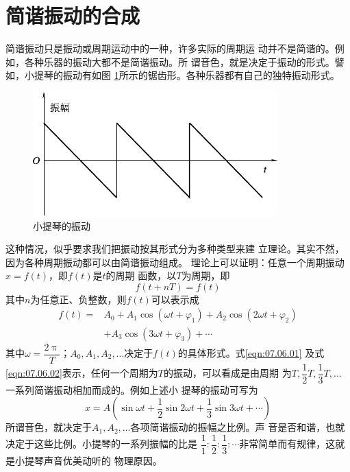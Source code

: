 \section{简谐振动的合成}\label{sec:07.06}

简谐振动只是振动或周期运动中的一种，许多实际的周期运
\clearpage
\noindent 动并不是简谐的。例如，各种乐器的振动大都不是简谐振动。所
谓音色，就是决定于振动的形式。譬如，小提琴的振动有如图
\ref{fig:07.10}\;所示的锯齿形。各种乐器都有自己的独特振动形式。

\begin{figure}[h]
  \centering
  \includegraphics{figure/fig07.10}
  \caption{小提琴的振动}
  \label{fig:07.10}
\end{figure}

这种情况，似乎要求我们把振动按其形式分为多种类型来建
立理论。其实不然，因为各种周期振动都可以由简谐振动组成。
理论上可以证明：任意一个周期振动$ x = f \left( t \right) $，即$ f \left( t \right) $是$ t $的周期
函数，以$ T $为周期，即
\begin{equation}\label{eqn:07.06.01}
  f \left( t + n T \right) = f ( t )
\end{equation}
其中$ n $为任意正、负整数，则$ f \left( t \right) $可以表示成
{\setlength{\mathindent}{4em}
\begin{equation}\label{eqn:07.06.02}
  \begin{aligned}
    f \left( t \right) = & A _ { 0 } + A _ { 1 } \cos \left( \omega t + \varphi _ { 1 } \right) + A _ { 2 } \cos \left( 2 \omega t + \varphi _ { 2 } \right) \\
                         & + A _ { 3 } \cos \left( 3 \omega t + \varphi _ { 3 } \right) + \cdots
  \end{aligned}
\end{equation}}%
其中$\omega = \dfrac { 2 \uppi } { T } $；$ A _ { 0 }, A _ { 1 }, A _ { 2 }, \dots $决定于$ f \left( t \right) $的具体形式。式\eqref{eqn:07.06.01}
及式\eqref{eqn:07.06.02}表示，任何一个周期为$ T $的振动，可以看成是由周期
为$ T, \dfrac { 1 } { 2 } T , \dfrac { 1 } { 3 } T , \dots $一系列简谐振动相加而成的。例如上述小
提琴的振动可写为
\begin{equation*}
  x = A \left( \sin \omega t + \frac { 1 } { 2 } \sin 2 \omega t + \frac { 1 } { 3 } \sin 3 \omega t + \cdots \right)
\end{equation*}
所谓音色，就决定于$ A _ { 1 } , A _ { 2 }, \dots $各项简谐振动的振幅之比例。声
音是否和谐，也就决定于这些比例。小提琴的一系列振幅的比是
$ \dfrac { 1 } { 1 } : \dfrac { 1 } { 2 } : \dfrac { 1 } { 3 }
  : \cdots $非常简单而有规律，这就是小提琴声音优美动听的
物理原因。

